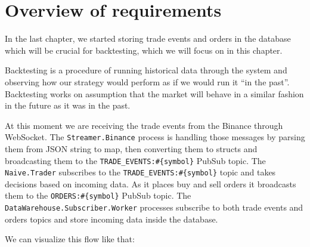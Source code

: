 \documentclass[
  oneside]{book}
\begin{document}
\section{Overview of requirements}\label{overview-of-requirements-2}

In the last chapter, we started storing trade events and orders in the database which will be crucial for backtesting, which we will focus on in this chapter.

Backtesting is a procedure of running historical data through the system and observing how our strategy would perform as if we would run it ``in the past''. Backtesting works on assumption that the market will behave in a similar fashion in the future as it was in the past.

\newpage

At this moment we are receiving the trade events from the Binance through WebSocket. The \texttt{Streamer.Binance} process is handling those messages by parsing them from JSON string to map, then converting them to structs and broadcasting them to the \texttt{TRADE\_EVENTS:\#\{symbol\}} PubSub topic. The \texttt{Naive.Trader} subscribes to the \texttt{TRADE\_EVENTS:\#\{symbol\}} topic and takes decisions based on incoming data. As it places buy and sell orders it broadcasts them to the \texttt{ORDERS:\#\{symbol\}} PubSub topic. The \texttt{DataWarehouse.Subscriber.Worker} processes subscribe to both trade events and orders topics and store incoming data inside the database.

We can visualize this flow like that:
\end{document}
